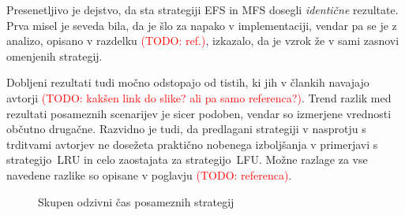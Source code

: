 \documentclass[a4paper, 12pt]{book}
\newcommand{\TODO}[1]{\textcolor{red}{(TODO: #1)}}
\begin{document}
Presenetljivo je dejstvo, da sta strategiji EFS in MFS dosegli
\textit{identične} rezultate. Prva misel je seveda bila, da je šlo za napako v
implementaciji, vendar pa se je z analizo, opisano v razdelku \TODO{ref.},
izkazalo, da je vzrok že v sami zasnovi omenjenih strategij.

Dobljeni rezultati tudi močno odstopajo od tistih, ki jih v člankih
navajajo avtorji \TODO{kakšen link do slike? ali pa samo referenca?}.
Trend razlik med rezultati posameznih scenarijev je sicer podoben, vendar so
izmerjene vrednosti občutno drugačne. Razvidno je tudi, da predlagani
strategiji v nasprotju s trditvami avtorjev ne dosežeta praktično nobenega
izboljšanja v primerjavi s strategijo~LRU in celo zaostajata za
strategijo~LFU. Možne razlage za vse navedene razlike so opisane v
poglavju \TODO{referenca}.

\begin{figure}

\caption{Skupen odzivni čas posameznih strategij}
\label{hist_rsp_t}
\end{figure}
\end{document}
